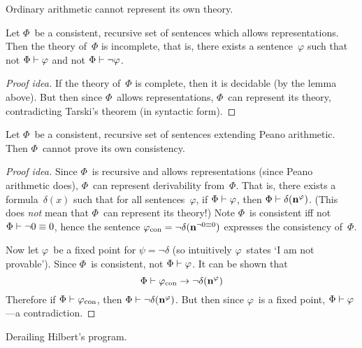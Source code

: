\begin{cor}
Ordinary arithmetic cannot represent its own theory.
\end{cor}

\begin{thm}
Let \(\Phi\)~be a consistent, recursive set of sentences which allows representations. Then the theory of~\(\Phi\) is incomplete, that is, there exists a sentence~\(\varphi\) such that not \(\Phi\vdash\varphi\) and not \(\Phi\vdash\lnot\varphi\).
\end{thm}
\begin{proof}[Proof idea]
If the theory of~\(\Phi\) is complete, then it is decidable (by the lemma above). But then since \(\Phi\)~allows representations, \(\Phi\)~can represent its theory, contradicting Tarski's theorem (in syntactic form).
\end{proof}

\begin{thm}
Let \(\Phi\)~be a consistent, recursive set of sentences extending Peano arithmetic. Then \(\Phi\)~cannot prove its own consistency.
\end{thm}
\begin{proof}[Proof idea]
Since \(\Phi\)~is recursive and allows representations (since Peano arithmetic does), \(\Phi\)~can represent derivability from~\(\Phi\). That is, there exists a formula~\(\delta(x)\) such that for all sentences~\(\varphi\), if \(\Phi\vdash\varphi\), then \(\Phi\vdash\delta(\mathbf{{n}}^{{\varphi}})\). (This does \emph{not} mean that \(\Phi\)~can represent its theory!) Note \(\Phi\)~is consistent iff not \(\Phi\vdash\lnot0\equiv 0\), hence the sentence \(\varphi_{\mathrm{con}}=\lnot\delta(\mathbf{{n}}^{{\lnot0\equiv0}})\) expresses the consistency of~\(\Phi\).

Now let \(\varphi\)~be a fixed point for \(\psi=\lnot\delta\) (so intuitively \(\varphi\)~states `I am not provable'). Since \(\Phi\)~is consistent, not \(\Phi\vdash\varphi\). It can be shown that
\[\Phi\vdash\varphi_{\mathrm{con}}\rightarrow\lnot\delta(\mathbf{{n}}^{{\varphi}})\]
Therefore if \(\Phi\vdash\varphi_{\mathrm{con}}\), then \(\Phi\vdash\lnot\delta(\mathbf{{n}}^{{\varphi}})\). But then since \(\varphi\)~is a fixed point, \(\Phi\vdash\varphi\)---a contradiction.
\end{proof}
\begin{app}
Derailing Hilbert's program.
\end{app}
